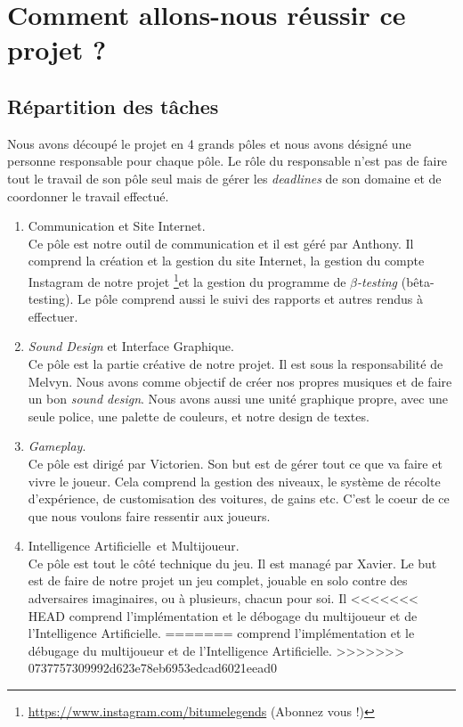 \documentclass[12pt,a4paper]{article}
\newcommand{\AI}{Intelligence Artificielle}
\begin{document}
\section{Comment allons-nous réussir ce projet ?}
\subsection{Répartition des tâches} 
Nous avons découpé le projet en 4 grands pôles et nous avons désigné une personne responsable
pour chaque pôle. Le rôle du responsable n'est pas de faire tout le travail de son pôle seul mais
de gérer les \textit{deadlines} de son domaine et de coordonner le travail effectué.\\
\begin{enumerate}
    \item Communication et Site Internet.\\
        Ce pôle est notre outil de communication et il est géré par Anthony. Il comprend la création
        et la gestion du site Internet, la gestion du compte Instagram de notre projet \footnote{\url{https://www.instagram.com/bitumelegends} (Abonnez vous !)}et la
        gestion du programme de \(\beta\)\textit{-testing} (bêta-testing). Le pôle comprend aussi le suivi
        des rapports et autres rendus à effectuer.
        \\
    \item \textit{Sound Design} et Interface Graphique.\\
        Ce pôle est la partie créative de notre projet. Il est sous la responsabilité de Melvyn.
        Nous avons comme objectif de créer nos propres musiques et de faire un bon \textit{sound design}.
        Nous avons aussi une unité graphique propre, avec une seule police, une palette de couleurs, et notre
        design de textes.
        \\
    \item \textit{Gameplay}.\\
        Ce pôle est dirigé par Victorien.
        Son but est de gérer tout ce que va faire et vivre le joueur. Cela comprend la gestion des niveaux,
        le système de récolte d'expérience, de customisation des voitures, de gains etc. C'est le coeur 
        de ce que nous voulons faire ressentir aux joueurs.
        \\
    \item \AI\, et Multijoueur.\\
        Ce pôle est tout le côté technique du jeu. Il est managé par Xavier. Le but est de faire de notre projet
        un jeu complet, jouable en solo contre des adversaires imaginaires, ou à plusieurs, chacun pour soi. Il 
<<<<<<< HEAD
        comprend l'implémentation et le débogage du multijoueur et de l'\AI.
=======
        comprend l'implémentation et le débugage du multijoueur et de l'\AI.
>>>>>>> 0737757309992d623e78eb6953edcad6021eead0
\end{enumerate}
\clearpage
\end{document}
